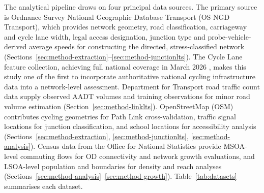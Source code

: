 The analytical pipeline draws on four principal data sources. The primary source is Ordnance Survey National Geographic Database Transport (OS NGD Transport), which provides network geometry, road classification, carriageway and cycle lane width, legal access designation, junction type and probe-vehicle-derived average speeds for constructing the directed, stress-classified network (Sections~\ref{sec:method-extraction}--\ref{sec:method-junctionlts}). The Cycle Lane feature collection, achieving full national coverage in March 2026 \parencite{ordnancesurvey2026e}, makes this study one of the first to incorporate authoritative national cycling infrastructure data into a network-level assessment. Department for Transport road traffic count data supply observed AADT volumes and training observations for minor road volume estimation (Section~\ref{sec:method-linklts}). OpenStreetMap (OSM) contributes cycling geometries for Path Link cross-validation, traffic signal locations for junction classification, and school locations for accessibility analysis (Sections~\ref{sec:method-extraction}, \ref{sec:method-junctionlts}, \ref{sec:method-analysis}). Census data from the Office for National Statistics provide MSOA-level commuting flows for OD connectivity and network growth evaluations, and LSOA-level population and boundaries for density and reach analyses (Sections~\ref{sec:method-analysis}--\ref{sec:method-growth}). Table~\ref{tab:datasets} summarises each dataset.

